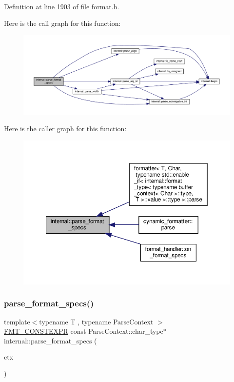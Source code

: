 Definition at line 1903 of file format.\+h.

Here is the call graph for this function\+:
\nopagebreak
\begin{figure}[H]
\begin{center}
\leavevmode
\includegraphics[width=350pt]{namespaceinternal_af89a4b19adfe070b0cb66cf9f694caf3_cgraph}
\end{center}
\end{figure}
Here is the caller graph for this function\+:
\nopagebreak
\begin{figure}[H]
\begin{center}
\leavevmode
\includegraphics[width=350pt]{namespaceinternal_af89a4b19adfe070b0cb66cf9f694caf3_icgraph}
\end{center}
\end{figure}
\mbox{\label{namespaceinternal_ac21f85f51ec37023df70a5a8288130d7}} 
\subsubsection{\texorpdfstring{parse\+\_\+format\+\_\+specs()}{parse\_format\_specs()}\hspace{0.1cm}{\footnotesize\ttfamily [2/2]}}
{\footnotesize\ttfamily template$<$typename T , typename Parse\+Context $>$ \\
\hyperlink{core_8h_a69201cb276383873487bf68b4ef8b4cd}{F\+M\+T\+\_\+\+C\+O\+N\+S\+T\+E\+X\+PR} const Parse\+Context\+::char\+\_\+type$\ast$ internal\+::parse\+\_\+format\+\_\+specs (\begin{DoxyParamCaption}\item[{Parse\+Context \&}]{ctx }\end{DoxyParamCaption})}



